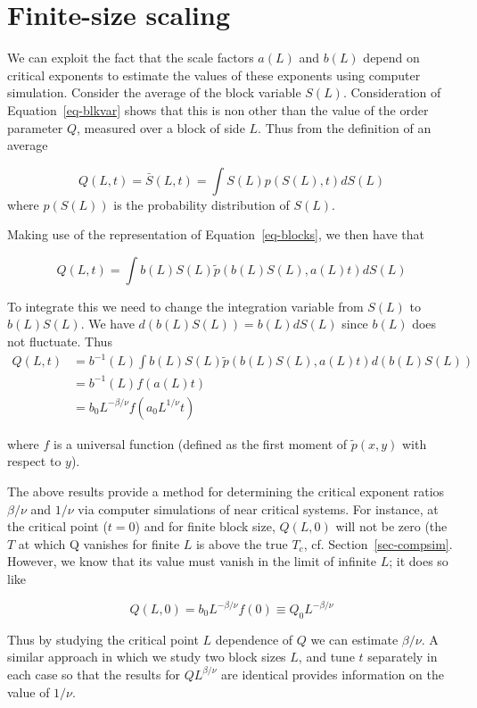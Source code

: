 \documentclass[
  letterpaper,
  enabledeprecatedfontcommands]{report}
\begin{document}
\section{Finite-size scaling}\label{sec-fss}

We can exploit the fact that the scale factors \(a(L)\) and \(b(L)\)
depend on critical exponents to estimate the values of these exponents
using computer simulation. Consider the average of the block variable
\(S(L)\). Consideration of Equation~\ref{eq-blkvar} shows that this is
non other than the value of the order parameter \(Q\), measured over a
block of side \(L\). Thus from the definition of an average

\[
Q(L,t)=\bar {S}(L,t)=\int S(L)p(S(L),t)dS(L)
\] where \(p(S(L))\) is the probability distribution of \(S(L)\).

Making use of the representation of Equation~\ref{eq-blocks}, we then
have that

\[Q
(L,t) = \int b(L)S(L)\tilde{p}(b(L)S(L),a(L)t)dS(L)
\]

To integrate this we need to change the integration variable from
\(S(L)\) to \(b(L)S(L)\). We have \(d(b(L)S(L))=b(L)dS(L)\) since
\(b(L)\) does not fluctuate. Thus \[
\begin{aligned}
Q(L,t)  & =  b^{-1}(L)\int b(L)S(L)\tilde{p}(b(L)S(L),a(L)t)d(b(L)S(L))\nonumber\\
        & =  b^{-1}(L)f(a(L)t)\nonumber\\
       & =  b_0L^{-\beta/\nu}f(a_0L^{1/\nu}t)
\end{aligned}
\]

where \(f\) is a universal function (defined as the first moment of
\(\tilde{p}(x,y)\) with respect to \(y\)).

The above results provide a method for determining the critical exponent
ratios \(\beta/\nu\) and \(1/\nu\) via computer simulations of near
critical systems. For instance, at the critical point (\(t=0\)) and for
finite block size, \(Q(L,0)\) will not be zero (the \(T\) at which Q
vanishes for finite \(L\) is above the true \(T_c\), cf.
Section~\ref{sec-compsim}. However, we know that its value must vanish
in the limit of infinite \(L\); it does so like

\[Q(L,0)=b_0L^{-\beta/\nu}f(0)\equiv Q_0L^{-\beta/\nu}\]

Thus by studying the critical point \(L\) dependence of \(Q\) we can
estimate \(\beta/\nu\). A similar approach in which we study two block
sizes \(L\), and tune \(t\) separately in each case so that the results
for \(QL^{\beta/\nu}\) are identical provides information on the value
of \(1/\nu\).
\end{document}
